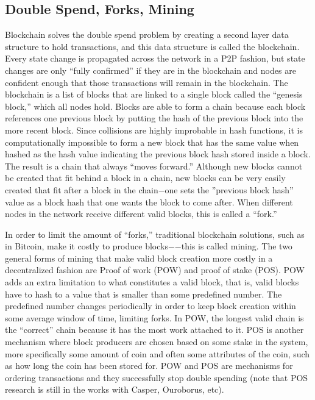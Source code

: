 \documentclass[letterpaper, 10 pt, conference]{ieeeconf}  %
\begin{document}
\subsection{Double Spend, Forks, Mining}
Blockchain solves the double spend problem by creating a second layer data structure to hold transactions, and this data structure is called the blockchain. Every state change is propagated across the network in a P2P fashion, but state changes are only “fully confirmed” if they are in the blockchain and nodes are confident enough that those transactions will remain in the blockchain. The blockchain is a list of blocks that are linked to a single block called the “genesis block,” which all nodes hold. Blocks are able to form a chain because each block references one previous block by putting the hash of the previous block into the more recent block. Since collisions are highly improbable in hash functions, it is computationally impossible to form a new block that has the same value when hashed as the hash value indicating the previous block hash stored inside a block. The result is a chain that always “moves forward.” Although new blocks cannot be created that fit behind a block in a chain, new blocks can be very easily created that fit after a block in the chain−one sets the ”previous block hash” value as a block hash that one wants the block to come after. When different nodes in the network receive different valid blocks, this is called a “fork.” 

In order to limit the amount of “forks,” traditional blockchain solutions, such as in Bitcoin, make it costly to produce blocks−−this is called mining. The two general forms of mining that make valid block creation more costly in a decentralized fashion are Proof of work (POW) and proof of stake (POS). POW adds an extra limitation to what constitutes a valid block, that is, valid blocks have to hash to a value that is smaller than some predefined number. The predefined number changes periodically in order to keep block creation within some average window of time, limiting forks. In POW, the longest valid chain is the “correct” chain because it has the most work attached to it. POS is another mechanism where block producers are chosen based on some stake in the system, more specifically some amount of coin and often some attributes of the coin, such as how long the coin has been stored for. POW and POS are mechanisms for ordering transactions and they successfully stop double spending (note that POS research is still in the works with Casper, Ouroborus, etc).
\end{document}
